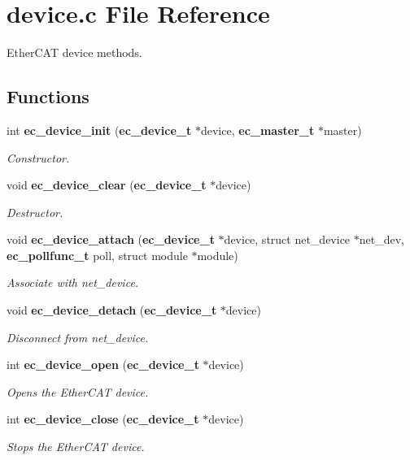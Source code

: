 \section{device.\-c File Reference}
\label{device_8c}


Ether\-C\-A\-T device methods.  


\subsection*{Functions}
\begin{DoxyCompactItemize}
\item 
int {\bf ec\-\_\-device\-\_\-init} ({\bf ec\-\_\-device\-\_\-t} $\ast$device, {\bf ec\-\_\-master\-\_\-t} $\ast$master)
\begin{DoxyCompactList}\small\item\em Constructor. \end{DoxyCompactList}\item 
void {\bf ec\-\_\-device\-\_\-clear} ({\bf ec\-\_\-device\-\_\-t} $\ast$device)
\begin{DoxyCompactList}\small\item\em Destructor. \end{DoxyCompactList}\item 
void {\bf ec\-\_\-device\-\_\-attach} ({\bf ec\-\_\-device\-\_\-t} $\ast$device, struct net\-\_\-device $\ast$net\-\_\-dev, {\bf ec\-\_\-pollfunc\-\_\-t} poll, struct module $\ast$module)
\begin{DoxyCompactList}\small\item\em Associate with net\-\_\-device. \end{DoxyCompactList}\item 
void {\bf ec\-\_\-device\-\_\-detach} ({\bf ec\-\_\-device\-\_\-t} $\ast$device)
\begin{DoxyCompactList}\small\item\em Disconnect from net\-\_\-device. \end{DoxyCompactList}\item 
int {\bf ec\-\_\-device\-\_\-open} ({\bf ec\-\_\-device\-\_\-t} $\ast$device)
\begin{DoxyCompactList}\small\item\em Opens the Ether\-C\-A\-T device. \end{DoxyCompactList}\item 
int {\bf ec\-\_\-device\-\_\-close} ({\bf ec\-\_\-device\-\_\-t} $\ast$device)
\begin{DoxyCompactList}\small\item\em Stops the Ether\-C\-A\-T device. \end{DoxyCompactList}\item 

\end{DoxyCompactItemize}

